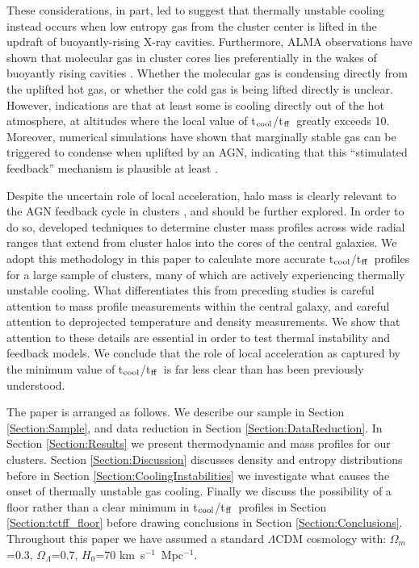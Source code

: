 \documentclass[twocolumn]{aastex6}
\newcommand{\tctff}{{t$_{\rm cool}$/t$_{\rm ff}$}}
\begin{document}
These considerations, in part, led \citet[][]{McNamara14,McNamara16} to suggest that thermally unstable cooling instead occurs when low entropy gas from the cluster center is lifted in the updraft of buoyantly-rising X-ray cavities.  Furthermore, ALMA observations have shown that molecular gas in cluster cores lies preferentially in the wakes of buoyantly rising cavities \cite[e.g.][]{McNamara14,Vantyghem16,Russell17}.  Whether the molecular gas is condensing directly from the uplifted hot gas, or whether the cold gas is being lifted directly is unclear.  However, indications are that at least some is cooling directly out of the hot atmosphere, at altitudes where the local value of \tctff\ greatly exceeds 10.   Moreover, numerical simulations have shown that marginally stable gas can be triggered to condense when uplifted by an AGN, indicating that this “stimulated feedback” mechanism is plausible at least \cite[][]{Revaz08,Gaspari12,Li14b,Brighenti15,Voit16,Yang16a}.

Despite the uncertain role of local acceleration, halo mass is clearly relevant to the AGN feedback cycle in clusters \cite[e.g][]{Main17}, and should be further explored.  In order to do so,  \citet[][]{Hogan17} developed techniques to determine cluster mass profiles across wide radial ranges that extend from cluster halos into the cores of the central galaxies.  We adopt this methodology in this paper to calculate more accurate \tctff\ profiles for a large sample of clusters, many of which are actively experiencing thermally unstable cooling.   What differentiates this from preceding studies is careful attention to mass profile measurements within the central galaxy, and careful attention to deprojected temperature and density measurements.  We show that attention to these details are essential in order to test thermal instability and feedback models.  We conclude that the role of local acceleration as captured by the minimum value of \tctff\ is far less clear than has been previously understood. 

The paper is arranged as follows.  We describe our sample in Section \ref{Section:Sample}, and data reduction in Section \ref{Section:DataReduction}.  In Section \ref{Section:Results} we present thermodynamic and mass profiles for our clusters.  Section \ref{Section:Discussion} discusses density and entropy distributions before in Section \ref{Section:CoolingInstabilities} we investigate what causes the onset of thermally unstable gas cooling.  Finally we discuss the possibility of a floor rather than a clear minimum in \tctff\ profiles in Section \ref{Section:tctff_floor} before drawing conclusions in Section \ref{Section:Conclusions}.  Throughout this paper we have assumed a standard $\Lambda$CDM cosmology with: $\Omega_{m}$=0.3, $\Omega_{\Lambda}$=0.7, $H_{0}$=70 km~s$^{-1}$~Mpc$^{-1}$. 
\end{document}
